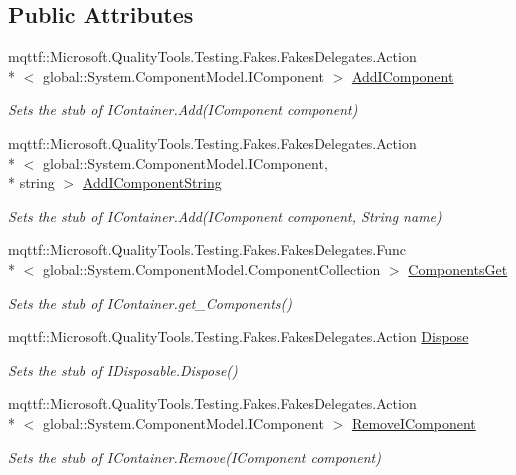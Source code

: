 \subsection*{Public Attributes}
\begin{DoxyCompactItemize}
\item 
mqttf\-::\-Microsoft.\-Quality\-Tools.\-Testing.\-Fakes.\-Fakes\-Delegates.\-Action\\*
$<$ global\-::\-System.\-Component\-Model.\-I\-Component $>$ \hyperlink{class_system_1_1_component_model_1_1_fakes_1_1_stub_i_container_a76583184126efbec1003e6928488d372}{Add\-I\-Component}
\begin{DoxyCompactList}\small\item\em Sets the stub of I\-Container.\-Add(\-I\-Component component)\end{DoxyCompactList}\item 
mqttf\-::\-Microsoft.\-Quality\-Tools.\-Testing.\-Fakes.\-Fakes\-Delegates.\-Action\\*
$<$ global\-::\-System.\-Component\-Model.\-I\-Component, \\*
string $>$ \hyperlink{class_system_1_1_component_model_1_1_fakes_1_1_stub_i_container_aa75ef14950c6b431f2723323d8955d94}{Add\-I\-Component\-String}
\begin{DoxyCompactList}\small\item\em Sets the stub of I\-Container.\-Add(\-I\-Component component, String name)\end{DoxyCompactList}\item 
mqttf\-::\-Microsoft.\-Quality\-Tools.\-Testing.\-Fakes.\-Fakes\-Delegates.\-Func\\*
$<$ global\-::\-System.\-Component\-Model.\-Component\-Collection $>$ \hyperlink{class_system_1_1_component_model_1_1_fakes_1_1_stub_i_container_a0a3eaa6792233226c151390196b1f021}{Components\-Get}
\begin{DoxyCompactList}\small\item\em Sets the stub of I\-Container.\-get\-\_\-\-Components()\end{DoxyCompactList}\item 
mqttf\-::\-Microsoft.\-Quality\-Tools.\-Testing.\-Fakes.\-Fakes\-Delegates.\-Action \hyperlink{class_system_1_1_component_model_1_1_fakes_1_1_stub_i_container_aad5dad066d6c8bbe05b95cf2ae94abce}{Dispose}
\begin{DoxyCompactList}\small\item\em Sets the stub of I\-Disposable.\-Dispose()\end{DoxyCompactList}\item 
mqttf\-::\-Microsoft.\-Quality\-Tools.\-Testing.\-Fakes.\-Fakes\-Delegates.\-Action\\*
$<$ global\-::\-System.\-Component\-Model.\-I\-Component $>$ \hyperlink{class_system_1_1_component_model_1_1_fakes_1_1_stub_i_container_a2932887c119d470c005fac1e585755a3}{Remove\-I\-Component}
\begin{DoxyCompactList}\small\item\em Sets the stub of I\-Container.\-Remove(\-I\-Component component)\end{DoxyCompactList}\end{DoxyCompactItemize}


